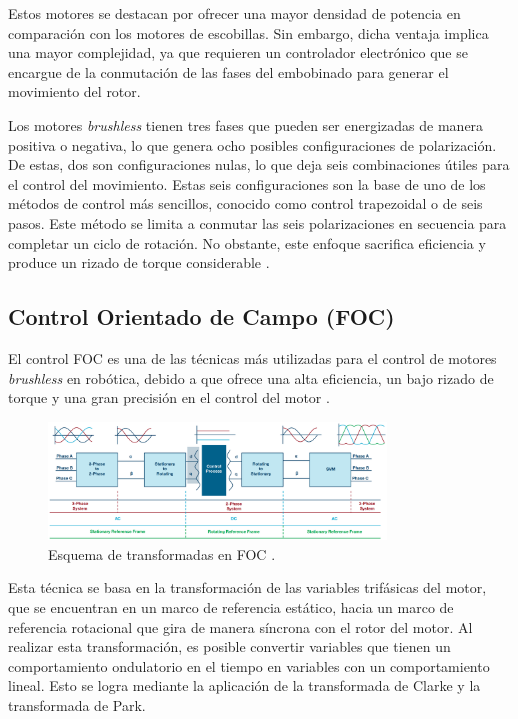 \documentclass[11pt]{report}
\begin{document}
Estos motores se destacan por ofrecer una mayor densidad de potencia en comparación con los motores de escobillas. Sin embargo, dicha ventaja implica una mayor complejidad, ya que requieren un controlador electrónico que se encargue de la conmutación de las fases del embobinado para generar el movimiento del rotor.

Los motores \textit{brushless} tienen tres fases que pueden ser energizadas de manera positiva o negativa, lo que genera ocho posibles configuraciones de polarización. De estas, dos son configuraciones nulas, lo que deja seis combinaciones útiles para el control del movimiento. Estas seis configuraciones son la base de uno de los métodos de control más sencillos, conocido como control trapezoidal o de seis pasos. Este método se limita a conmutar las seis polarizaciones en secuencia para completar un ciclo de rotación. No obstante, este enfoque sacrifica eficiencia y produce un rizado de torque considerable \cite{fisher2014high_STEP} \cite{juanpere_tecnicas}.

\newpage
\subsection{Control Orientado de Campo (FOC)}
El control FOC es una de las técnicas más utilizadas para el control de motores \textit{brushless} en robótica, debido a que ofrece una alta eficiencia, un bajo rizado de torque y una gran precisión en el control del motor \cite{Garca2011ComparisonBF}\cite{juanpere_tecnicas}.

\begin{figure}[ht]
	\centering
	\includegraphics[width=0.8\textwidth]{imagenes/transformadas_foc.png}
	\caption{Esquema de transformadas en FOC \cite{frick2018bldc}.}
	\label{fig:foc_transform}
\end{figure}
\FloatBarrier

Esta técnica se basa en la transformación de las variables trifásicas del motor, que se encuentran en un marco de referencia estático, hacia un marco de referencia rotacional que gira de manera síncrona con el rotor del motor. Al realizar esta transformación, es posible convertir variables que tienen un comportamiento ondulatorio en el tiempo en variables con un comportamiento lineal. Esto se logra mediante la aplicación de la transformada de Clarke y la transformada de Park.
\end{document}
